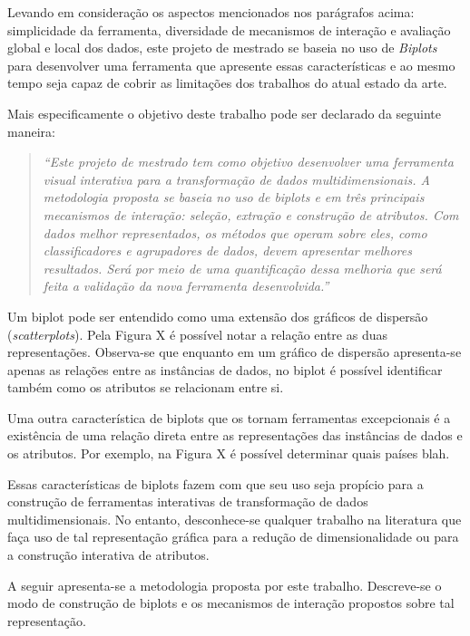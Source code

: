 Levando em consideração os aspectos mencionados nos
parágrafos acima: simplicidade da ferramenta, diversidade de
mecanismos de interação e avaliação global e local dos
dados, este projeto de mestrado se baseia no uso de
\emph{Biplots}~\cite{Gabriel1971} para desenvolver uma
ferramenta que apresente essas características e ao mesmo
tempo seja capaz de cobrir as limitações dos trabalhos do
atual estado da arte.

Mais especificamente o objetivo deste trabalho pode ser
declarado da seguinte maneira:

\begin{quote} \emph{``Este projeto de mestrado tem como
        objetivo desenvolver uma ferramenta visual
        interativa para a transformação de dados
        multidimensionais. A metodologia proposta se baseia
        no uso de biplots e em três principais
        mecanismos de interação: seleção, extração e
        construção de atributos. Com dados melhor
        representados, os métodos que operam sobre eles,
        como classificadores e agrupadores de dados, devem
        apresentar melhores resultados. Será por meio de uma
        quantificação dessa melhoria que será feita a
validação da nova ferramenta desenvolvida.''} \end{quote}

Um biplot pode ser entendido como uma extensão dos gráficos
de dispersão (\emph{scatterplots}). Pela Figura X é possível
notar a relação entre as duas representações. Observa-se que
enquanto em um gráfico de dispersão apresenta-se apenas as
relações entre as instâncias de dados, no biplot é possível
identificar também como os atributos se relacionam entre si.

Uma outra característica de biplots que os tornam
ferramentas excepcionais é a existência de uma relação
direta entre as representações das instâncias de dados e os
atributos. Por exemplo, na Figura X é possível determinar
quais países blah.

Essas características de biplots fazem com que seu uso seja
propício para a construção de ferramentas interativas de
transformação de dados multidimensionais. No entanto,
desconhece-se qualquer trabalho na literatura que faça uso
de tal representação gráfica para a redução de
dimensionalidade ou para a construção interativa de
atributos. 

A seguir apresenta-se a metodologia proposta por este
trabalho. Descreve-se o modo de construção de biplots
e os mecanismos de interação propostos sobre tal representação.

